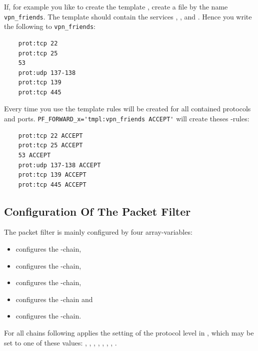 If, for example you like to create the template , create a
file by the name \texttt{vpn\_friends}. The template should contain the services
, ,  and .
Hence you write the following to \texttt{vpn\_friends}:

\begin{example}
\begin{verbatim}
    prot:tcp 22
    prot:tcp 25
    53
    prot:udp 137-138
    prot:tcp 139
    prot:tcp 445
\end{verbatim}
\end{example}

\noindent Every time you use the template  rules will be
created for all contained protocols and ports.
\verb+PF_FORWARD_x='tmpl:vpn_friends ACCEPT'+ will create theses
-rules:

\begin{example}
\begin{verbatim}
    prot:tcp 22 ACCEPT
    prot:tcp 25 ACCEPT
    53 ACCEPT
    prot:udp 137-138 ACCEPT
    prot:tcp 139 ACCEPT
    prot:tcp 445 ACCEPT
\end{verbatim}
\end{example}

\subsection{Configuration Of The Packet Filter}

The packet filter is mainly configured by four array-variables:

\begin{itemize}
  \item {} configures the -chain,
  \item {} configures the -chain,
  \item {} configures the -chain,
  \item {} configures the -chain and
  \item {} configures the -chain.
\end{itemize}

 For all chains following applies
the setting of the protocol level in , which may be
set to one of these values: , , ,
, , , ,
.

